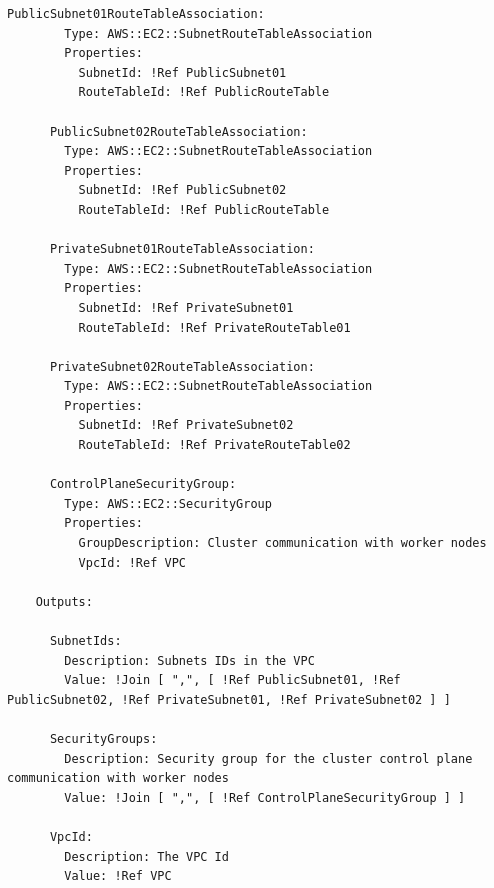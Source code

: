 \begin{lstlisting}[caption={AWS CloudFormation YAML Template for EKS IPv4}]
      PublicSubnet01RouteTableAssociation:
        Type: AWS::EC2::SubnetRouteTableAssociation
        Properties:
          SubnetId: !Ref PublicSubnet01
          RouteTableId: !Ref PublicRouteTable
    
      PublicSubnet02RouteTableAssociation:
        Type: AWS::EC2::SubnetRouteTableAssociation
        Properties:
          SubnetId: !Ref PublicSubnet02
          RouteTableId: !Ref PublicRouteTable
    
      PrivateSubnet01RouteTableAssociation:
        Type: AWS::EC2::SubnetRouteTableAssociation
        Properties:
          SubnetId: !Ref PrivateSubnet01
          RouteTableId: !Ref PrivateRouteTable01
    
      PrivateSubnet02RouteTableAssociation:
        Type: AWS::EC2::SubnetRouteTableAssociation
        Properties:
          SubnetId: !Ref PrivateSubnet02
          RouteTableId: !Ref PrivateRouteTable02
    
      ControlPlaneSecurityGroup:
        Type: AWS::EC2::SecurityGroup
        Properties:
          GroupDescription: Cluster communication with worker nodes
          VpcId: !Ref VPC
    
    Outputs:
    
      SubnetIds:
        Description: Subnets IDs in the VPC
        Value: !Join [ ",", [ !Ref PublicSubnet01, !Ref PublicSubnet02, !Ref PrivateSubnet01, !Ref PrivateSubnet02 ] ]
    
      SecurityGroups:
        Description: Security group for the cluster control plane communication with worker nodes
        Value: !Join [ ",", [ !Ref ControlPlaneSecurityGroup ] ]
    
      VpcId:
        Description: The VPC Id
        Value: !Ref VPC
    
\end{lstlisting}
